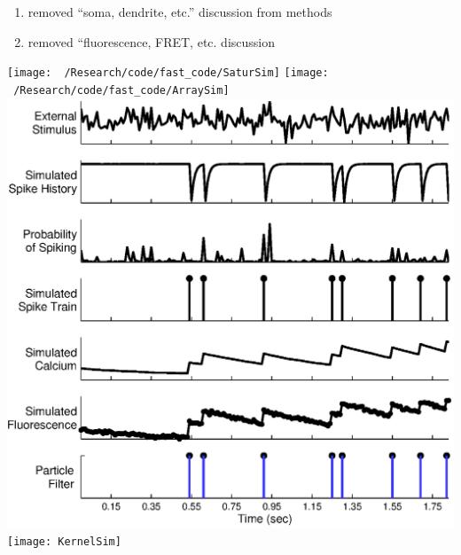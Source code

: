\documentclass{article}
\begin{document}
\begin{enumerate}
\item removed ``soma, dendrite, etc.'' discussion from methods
\item removed ``fluorescence, FRET, etc. discussion
\end{enumerate}

\texttt{[image: ~/Research/code/fast\_code/SaturSim]}
\texttt{[image: ~/Research/code/fast\_code/ArraySim]}
\includegraphics{StimSim}
\texttt{[image: KernelSim]}
\end{document}
